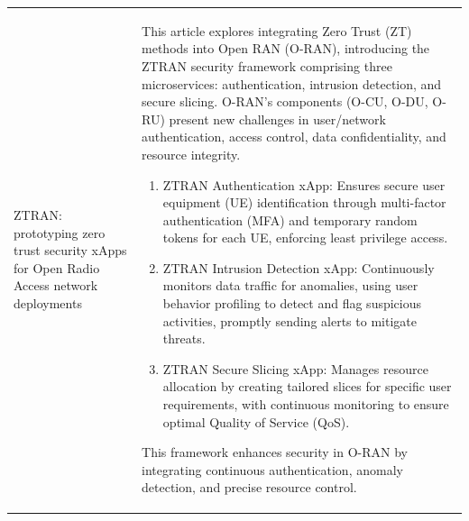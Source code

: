 \documentclass{report}
\begin{document}
\begin{longtable}{|p{4cm}|p{12cm}|}
    ZTRAN: prototyping zero trust security xApps for Open Radio Access network deployments &
    \parbox[t]{12cm}{
        This article explores integrating Zero Trust (ZT) methods into Open RAN (O-RAN), introducing the ZTRAN security framework comprising three microservices: authentication, intrusion detection, and secure slicing. O-RAN’s components (O-CU, O-DU, O-RU) present new challenges in user/network authentication, access control, data confidentiality, and resource integrity. 
        \begin{enumerate}
            \item ZTRAN Authentication xApp: Ensures secure user equipment (UE) identification through multi-factor authentication (MFA) and temporary random tokens for each UE, enforcing least privilege access.
            \item ZTRAN Intrusion Detection xApp: Continuously monitors data traffic for anomalies, using user behavior profiling to detect and flag suspicious activities, promptly sending alerts to mitigate threats.
            \item ZTRAN Secure Slicing xApp: Manages resource allocation by creating tailored slices for specific user requirements, with continuous monitoring to ensure optimal Quality of Service (QoS).
        \end{enumerate}
        This framework enhances security in O-RAN by integrating continuous authentication, anomaly detection, and precise resource control.
    }\\ 
    \hline


\end{longtable}
\end{document}
